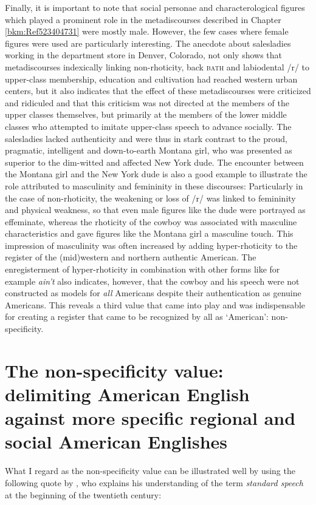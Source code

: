 Finally, it is important to note that social personae and characterological figures which played a prominent role in the metadiscourses described in Chapter \ref{bkm:Ref523404731} were mostly male. However, the few cases where female figures were used are particularly interesting. The anecdote about salesladies working in the department store in Denver, Colorado, not only shows that metadiscourses indexically linking non-rhoticity, back \textsc{bath} and labiodental /r/ to upper-class membership, education and cultivation had reached western urban centers, but it also indicates that the effect of these metadiscourses were criticized and ridiculed and that this criticism was not directed at the members of the upper classes themselves, but primarily at the members of the lower middle classes who attempted to imitate upper-class speech to advance socially. The salesladies lacked authenticity and were thus in stark contrast to the proud, pragmatic, intelligent and down-to-earth Montana girl, who was presented as superior to the dim-witted and affected New York dude. The encounter between the Montana girl and the New York dude is also a good example to illustrate the role attributed to masculinity and femininity in these discourses: Particularly in the case of non-rhoticity, the weakening or loss of /r/ was linked to femininity and physical weakness, so that even male figures like the dude were portrayed as effeminate, whereas the rhoticity of the cowboy was associated with masculine characteristics and gave figures like the Montana girl a masculine touch. This impression of masculinity was often increased by adding hyper-rhoticity to the register of the (mid)western and northern authentic American. The enregisterment of hyper-rhoticity in combination with other forms like for example \emph{ain’t} also indicates, however, that the cowboy and his speech were not constructed as models for \emph{all} Americans despite their authentication as genuine Americans. This reveals a third value that came into play and was indispensable for creating a register that came to be recognized by all as ‘American’: non-specificity.

\section[The non-specificity value]{The non-specificity value: delimiting American English against more specific regional and social American Englishes}
\hypertarget{Toc63021249}{}
What I regard as the non-specificity value can be illustrated well by using the following quote by \citet[ix]{Krapp1919}, who explains his understanding of the term \textit{standard speech} at the beginning of the twentieth century:


